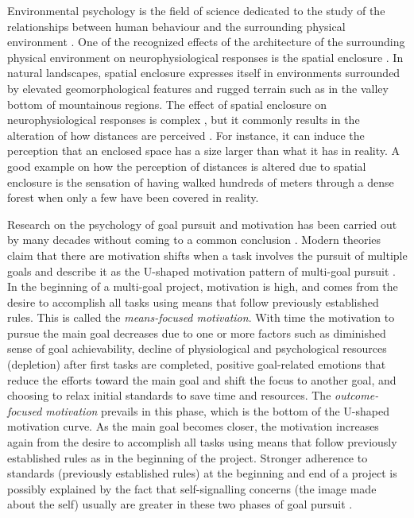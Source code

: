Environmental psychology is the field of science dedicated to the study of the relationships between human 
behaviour and the surrounding physical environment \cite{BonnesEtAl2002}. One of the recognized effects of the 
architecture of the surrounding physical environment on neurophysiological responses is the spatial enclosure 
\cite{EpsteinEtAl1998}. In natural landscapes, spatial enclosure expresses itself in environments surrounded by
elevated geomorphological features and rugged terrain such as in the valley bottom of mountainous regions. The 
effect of spatial enclosure on neurophysiological responses is complex \cite{StampsEtAl2004}, but it commonly 
results in the alteration of how distances are perceived \cite{Coeterier1994}. For instance, it can induce the 
perception that an enclosed space has a size larger than what it has in reality. A good example on how the 
perception of distances is altered due to spatial enclosure is the sensation of having walked hundreds of 
meters through a dense forest when only a few have been covered in reality.

Research on the psychology of goal pursuit and motivation has been carried out by many decades without coming 
to a common conclusion \cite{Toure-TilleryEtAl2011a, Hull1932}. Modern theories claim that there are motivation
shifts when a task involves the pursuit of multiple goals and describe it as the U-shaped motivation pattern of 
multi-goal pursuit \cite{BonezziEtAl2011, Toure-TilleryEtAl2011a}. In the beginning of a multi-goal project, 
motivation is high, and comes from the desire to accomplish all tasks using means that follow previously 
established rules. This is called the \emph{means-focused motivation}. With time the motivation to pursue the 
main goal decreases due to one or more factors such as diminished sense of goal achievability, decline 
of physiological and psychological resources (depletion) after first tasks are completed, positive goal-related 
emotions that reduce the efforts toward the main goal and shift the focus to another goal, and choosing to 
relax initial standards to save time and resources. The \emph{outcome-focused motivation} prevails in this 
phase, which is the bottom of the U-shaped motivation curve. As the main goal becomes closer, the motivation 
increases again from the desire to accomplish all tasks using means that follow previously established rules as 
in the beginning of the project. Stronger adherence to standards (previously established rules) at the 
beginning and end of a project is possibly explained by the fact that self-signalling concerns (the image made 
about the self) usually are greater in these two phases of goal pursuit 
\cite{Toure-TilleryEtAl2011}.

